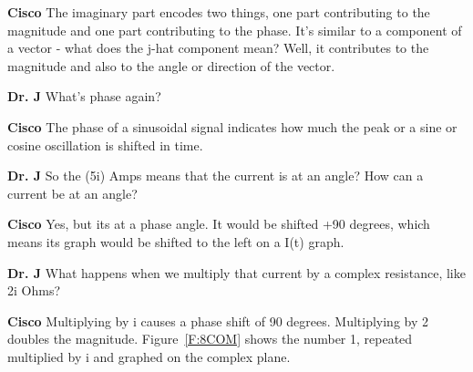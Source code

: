 \documentclass{book}
\numberwithin{equation}{section}
\theoremstyle{definition}
\begin{document}
\setlength{\hangindent}{30pt}\noindent \textbf{Cisco}
The imaginary part encodes two things, one part contributing to the magnitude and one part contributing to the phase. It's similar to a component of a vector - what does the j-hat component mean? Well, it contributes to the magnitude and also to the angle or direction of the vector.\par
\vspace{6pt}

\setlength{\hangindent}{30pt}\noindent \textbf{Dr. J}
What's phase again?\par
\vspace{6pt}

\setlength{\hangindent}{30pt}\noindent \textbf{Cisco}
The phase of a sinusoidal signal indicates how much the peak or a sine or cosine oscillation is shifted in time.\par
\vspace{6pt}

\setlength{\hangindent}{30pt}\noindent \textbf{Dr. J}
So the (5i) Amps means that the current is at an angle? How can a current be at an angle?\par
\vspace{6pt}

\setlength{\hangindent}{30pt}\noindent \textbf{Cisco}
Yes, but its at a phase angle. It would be shifted +90 degrees, which means its graph would be shifted to the left on a I(t) graph.\par
\vspace{6pt}

\setlength{\hangindent}{30pt}\noindent \textbf{Dr. J}
What happens when we multiply that current by a complex resistance, like 2i Ohms?\par
\vspace{6pt}

\setlength{\hangindent}{30pt}\noindent \textbf{Cisco}
Multiplying by i causes a phase shift of 90 degrees. Multiplying by 2 doubles the magnitude. Figure~\ref{F:8COM} shows the number 1, repeated multiplied by i and graphed on the complex plane.\par
\vspace{6pt}
\end{document}
